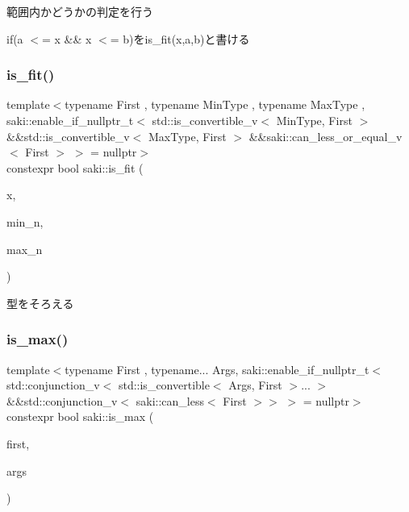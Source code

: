 範囲内かどうかの判定を行う 

if(a $<$= x \&\& x $<$= b)をis\+\_\+fit(x,a,b)と書ける \mbox{\label{namespacesaki_a09478d8cb01d75e93d34f884d7133dc9}} 
\subsubsection{\texorpdfstring{is\+\_\+fit()}{is\_fit()}\hspace{0.1cm}{\footnotesize\ttfamily [2/2]}}
{\footnotesize\ttfamily template$<$typename First , typename Min\+Type , typename Max\+Type , saki\+::enable\+\_\+if\+\_\+nullptr\+\_\+t$<$ std\+::is\+\_\+convertible\+\_\+v$<$ Min\+Type, First $>$ \&\&std\+::is\+\_\+convertible\+\_\+v$<$ Max\+Type, First $>$ \&\&saki\+::can\+\_\+less\+\_\+or\+\_\+equal\+\_\+v$<$ First $>$ $>$  = nullptr$>$ \\
constexpr bool saki\+::is\+\_\+fit (\begin{DoxyParamCaption}\item[{First}]{x,  }\item[{Min\+Type}]{min\+\_\+n,  }\item[{Max\+Type}]{max\+\_\+n }\end{DoxyParamCaption})}



型をそろえる 

\mbox{\label{namespacesaki_af73b5897b021844313675413b6c8aac2}} 
\subsubsection{\texorpdfstring{is\+\_\+max()}{is\_max()}}
{\footnotesize\ttfamily template$<$typename First , typename... Args, saki\+::enable\+\_\+if\+\_\+nullptr\+\_\+t$<$ std\+::conjunction\+\_\+v$<$ std\+::is\+\_\+convertible$<$ Args, First $>$... $>$ \&\&std\+::conjunction\+\_\+v$<$ saki\+::can\+\_\+less$<$ First $>$$>$ $>$  = nullptr$>$ \\
constexpr bool saki\+::is\+\_\+max (\begin{DoxyParamCaption}\item[{const First \&}]{first,  }\item[{const Args \&...}]{args }\end{DoxyParamCaption})}



